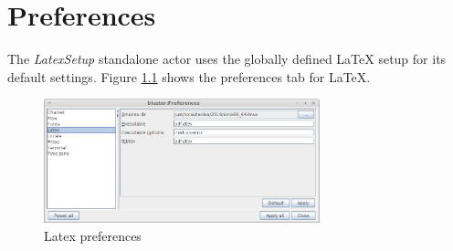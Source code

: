 \documentclass[a4paper]{book}
\begin{document}
\chapter{Preferences}
\label{preferences}
The \textit{LatexSetup} standalone actor uses the globally defined
LaTeX setup for its default settings.
Figure \ref{latex_preferences} shows the preferences tab for LaTeX.
\begin{figure}[htb]
  \centering
  \includegraphics[width=8.0cm]{images/latex_preferences.png}
  \caption{Latex preferences}
  \label{latex_preferences}
\end{figure}


\end{document}
